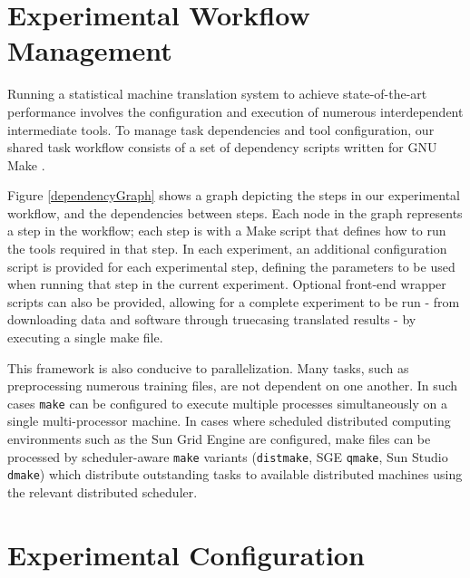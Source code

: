 \documentclass[11pt]{article}
\begin{document}
\section{Experimental Workflow Management}
\label{Framework}


Running a statistical machine translation system to achieve state-of-the-art performance involves the configuration and execution of numerous interdependent intermediate tools. To manage task dependencies and tool configuration, our shared task workflow consists of a set of dependency scripts written for GNU Make \cite{gnumake}. 

Figure \ref{dependencyGraph} shows a graph depicting the steps in our experimental workflow, and the dependencies between steps. Each node in the graph represents a step in the workflow; each step is with a Make script that defines how to run the tools required in that step. In each experiment, an additional configuration script is provided for each experimental step, defining the parameters to be used when running that step in the current experiment. Optional front-end wrapper scripts can also be provided, allowing for a complete experiment to be run - from downloading data and software through truecasing translated results - by executing a single make file.

This framework is also conducive to parallelization. Many tasks, such as preprocessing numerous training files, are not dependent on one another. In such cases {\tt make} can be configured to execute multiple processes simultaneously on a single multi-processor machine. In cases where scheduled distributed computing environments such as the Sun Grid Engine are configured, make files can be processed by scheduler-aware {\tt make} variants ({\tt distmake}, SGE {\tt qmake}, Sun Studio {\tt dmake}) which distribute outstanding tasks to available distributed machines using the relevant distributed scheduler.





\section{Experimental Configuration}
\label{Design}
\end{document}
